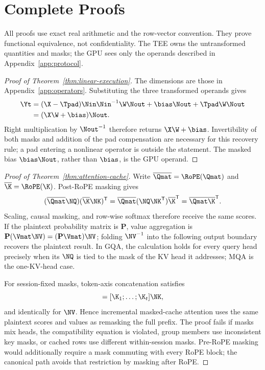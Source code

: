 \section{Complete Proofs}
\label{app:proofs}

All proofs use exact real arithmetic and the row-vector convention.  They prove
functional equivalence, not confidentiality.  The TEE owns the untransformed
quantities and masks; the GPU sees only the operands described in
Appendix~\ref{app:protocol}.

\begin{proof}[Proof of Theorem~\ref{thm:linear-execution}]
The dimensions are those in Appendix~\ref{app:operators}.  Substituting the
three transformed operands gives
\begin{align}
\Yt
&=(\X-\Tpad)\Nin\Nin^{-1}\W\Nout
  +\bias\Nout+\Tpad\W\Nout\nonumber\\
&=(\X\W+\bias)\Nout.
\end{align}
Right multiplication by $\Nout^{-1}$ therefore returns $\X\W+\bias$.
Invertibility of both masks and addition of the pad compensation are necessary
for this recovery rule; a pad entering a nonlinear operator is outside the
statement.  The masked bias $\bias\Nout$, rather than $\bias$, is the GPU
operand.
\end{proof}

\begin{proof}[Proof of Theorem~\ref{thm:attention-cache}]
Write $\overline{\Qmat}=\RoPE(\Qmat)$ and
$\overline{\K}=\RoPE(\K)$.  Post-RoPE masking gives
\begin{equation}
(\overline{\Qmat}\NQ)(\overline{\K}\NK)^{\mathsf T}
=\overline{\Qmat}(\NQ\NK^{\mathsf T})\overline{\K}^{\mathsf T}
=\overline{\Qmat}\overline{\K}^{\mathsf T}.
\end{equation}
Scaling, causal masking, and row-wise softmax therefore receive the same
scores.  If the plaintext probability matrix is $\mathbf P$, value aggregation
is $\mathbf P(\Vmat\NV)=(\mathbf P\Vmat)\NV$; folding $\NV^{-1}$ into the following
output boundary recovers the plaintext result.  In GQA, the calculation holds
for every query head precisely when its $\NQ$ is tied to the mask of the KV
head it addresses; MQA is the one-KV-head case.

For session-fixed masks, token-axis concatenation satisfies
\begin{equation}
[\K_1\NK;\ldots;\K_t\NK]=[\K_1;\ldots;\K_t]\NK,
\end{equation}
and identically for $\NV$.  Hence incremental masked-cache attention uses the
same plaintext scores and values as remasking the full prefix.  The proof fails
if masks mix heads, the compatibility equation is violated, group members use
inconsistent key masks, or cached rows use different within-session masks.
Pre-RoPE masking would additionally require a mask commuting with every RoPE
block; the canonical path avoids that restriction by masking after RoPE.
\end{proof}

